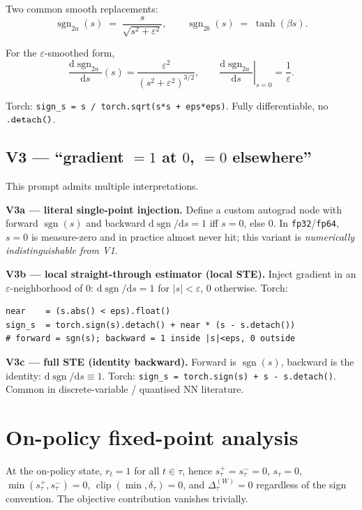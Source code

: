 \documentclass[11pt]{article}
\DeclareMathOperator*{\clip}{clip}
\DeclareMathOperator{\sign}{sgn}
\newcommand{\dif}{\mathrm{d}}
\begin{document}
Two common smooth replacements:
\[
\sign_{2a}(s) \;=\; \frac{s}{\sqrt{s^2+\varepsilon^2}},
\qquad
\sign_{2b}(s) \;=\; \tanh(\beta s).
\]

For the $\varepsilon$-smoothed form,
\[
\frac{\dif\sign_{2a}}{\dif s}(s) = \frac{\varepsilon^2}{(s^2+\varepsilon^2)^{3/2}},
\qquad
\left.\frac{\dif\sign_{2a}}{\dif s}\right|_{s=0} = \frac{1}{\varepsilon}.
\]

Torch: \verb|sign_s = s / torch.sqrt(s*s + eps*eps)|. Fully
differentiable, no $\verb|.detach()|$.

\subsection*{V3 --- ``gradient $=1$ at $0$, $=0$ elsewhere''}

This prompt admits multiple interpretations.

\textbf{V3a --- literal single-point injection.} Define a custom autograd
node with forward $\sign(s)$ and backward $\dif\sign/\dif s = 1$ iff
$s = 0$, else $0$. In \texttt{fp32}/\texttt{fp64}, $s=0$ is measure-zero
and in practice almost never hit; this variant is \emph{numerically
indistinguishable from V1}.

\textbf{V3b --- local straight-through estimator (local STE).}
Inject gradient in an $\varepsilon$-neighborhood of $0$:
$\dif\sign/\dif s = 1$ for $|s| < \varepsilon$, $0$ otherwise. Torch:
\begin{verbatim}
near    = (s.abs() < eps).float()
sign_s  = torch.sign(s).detach() + near * (s - s.detach())
# forward = sgn(s); backward = 1 inside |s|<eps, 0 outside
\end{verbatim}

\textbf{V3c --- full STE (identity backward).}
Forward is $\sign(s)$, backward is the identity:
$\dif\sign/\dif s \equiv 1$. Torch: \verb|sign_s = torch.sign(s) + s - s.detach()|.
Common in discrete-variable / quantised NN literature.

\section{On-policy fixed-point analysis}
\label{sec:onpolicy}

At the on-policy state, $r_t = 1$ for all $t \in \tau$, hence
$s_\tau^+ = s_\tau^- = 0$, $s_\tau = 0$,
$\min(s_\tau^+, s_\tau^-) = 0$, $\clip(\min,\delta_\tau)=0$, and
$\Delta_\tau^{(W)} = 0$ regardless of the sign convention. The objective
contribution vanishes trivially.
\end{document}
